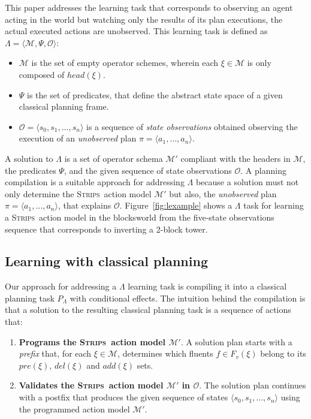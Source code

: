 \documentclass{article}
\newcommand{\tup}[1]{{\langle #1 \rangle}}
\newcommand{\strips}{\textsc{Strips}}     %
\begin{document}
This paper addresses the learning task that corresponds to observing an agent acting in the world but watching only the results of its plan executions, the actual executed actions are unobserved. This learning task is defined as $\Lambda=\tup{\mathcal{M},\Psi,\mathcal{O}}$:
\begin{itemize}
\item $\mathcal{M}$ is the set of empty operator schemes, wherein each $\xi\in\mathcal{M}$ is only composed of $head(\xi)$.
\item $\Psi$ is the set of predicates, that define the abstract state space of a given classical planning frame.
\item $\mathcal{O}=\tup{s_0,s_1,\ldots,s_{n}}$ is a sequence of {\em state observations} obtained observing the execution of an {\em unobserved} plan $\pi=\tup{a_1, \ldots, a_n}$.
\end{itemize}

A solution to $\Lambda$ is a set of operator schema $\mathcal{M}'$ compliant with the headers in $\mathcal{M}$, the predicates $\Psi$, and the given sequence of state observations $\mathcal{O}$. A planning compilation is a suitable approach for addressing $\Lambda$ because a solution must not only determine the \strips\ action model $\mathcal{M}'$ but also, the {\em unobserved} plan $\pi=\tup{a_1, \ldots, a_n}$, that explains $\mathcal{O}$. Figure~\ref{fig:lexample} shows a $\Lambda$ task for learning a \strips\ action model in the blocksworld from the five-state observations sequence that corresponds to inverting a 2-block tower.


\subsection{Learning with classical planning}

Our approach for addressing a $\Lambda$ learning task is compiling it into a classical planning task $P_{\Lambda}$ with conditional effects. The intuition behind the compilation is that a solution to the resulting classical planning task is a sequence of actions that:

\begin{enumerate}
\item {\bf Programs the \strips\ action model $\mathcal{M}'$}. A solution plan starts with a {\em prefix} that, for each $\xi\in\mathcal{M}$, determines which fluents $f\in F_v(\xi)$ belong to its $pre(\xi)$, $del(\xi)$ and $add(\xi)$ sets.
\item {\bf Validates the \strips\ action model $\mathcal{M}'$ in $\mathcal{O}$}. The solution plan continues with a postfix that produces the given sequence of states $\tup{s_0,s_1,\ldots,s_{n}}$ using the programmed action model $\mathcal{M}'$.
\end{enumerate}
\end{document}
